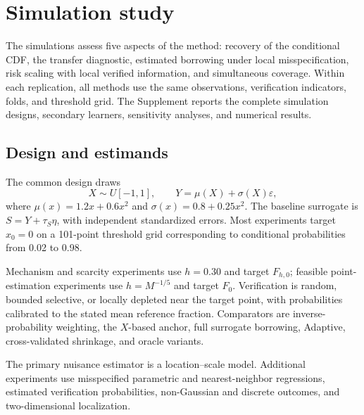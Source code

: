 \section{Simulation study}
\label{sec:simulation}

The simulations assess five aspects of the method: recovery of the conditional
CDF, the transfer diagnostic, estimated borrowing under local misspecification,
risk scaling with local verified information, and simultaneous coverage. Within
each replication, all methods use the same observations, verification
indicators, folds, and threshold grid. The Supplement reports the complete
simulation designs, secondary learners, sensitivity analyses, and numerical
results.

\subsection{Design and estimands}

The common design draws
\[
X\sim U[-1,1],
\qquad
Y=\mu(X)+\sigma(X)\varepsilon,
\]
where \(\mu(x)=1.2x+0.6x^2\) and \(\sigma(x)=0.8+0.25x^2\). The baseline surrogate is \(S=Y+\tau_S\eta\), with independent standardized errors. Most experiments target \(x_0=0\) on a 101-point threshold grid corresponding to conditional probabilities from 0.02 to 0.98.

Mechanism and scarcity experiments use \(h=0.30\) and target \(F_{h,0}\); feasible point-estimation experiments use \(h=M^{-1/5}\) and target \(F_0\). Verification is random, bounded selective, or locally depleted near the target point, with probabilities calibrated to the stated mean reference fraction. Comparators are inverse-probability weighting, the \(X\)-based anchor, full surrogate borrowing, Adaptive, cross-validated shrinkage, and oracle variants.

The primary nuisance estimator is a location--scale model. Additional
experiments use misspecified parametric and nearest-neighbor regressions,
estimated verification probabilities, non-Gaussian and discrete outcomes, and
two-dimensional localization.



